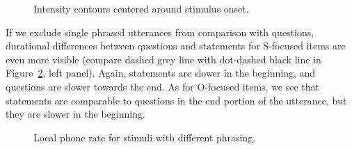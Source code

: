 \begin{figure}[!htbp]
\centering
{}
\caption{Intensity contours centered around stimulus onset.}
\label{fig405}\end{figure}

If we exclude single phrased utterances from comparison with questions, durational differences between questions and statements for S-focused items are even more visible (compare dashed grey line with dot-dashed black line in Figure~\ref{fig406}, left panel). Again, statements are slower in the beginning, and questions are slower towards the end. As for O-focused items, we see that statements are comparable to questions in the end portion of the utterance, but they are slower in the beginning. 

\begin{figure}[!htbp]
\centering
{}
\caption{Local phone rate for stimuli with different phrasing.}
\label{fig406}\end{figure}

